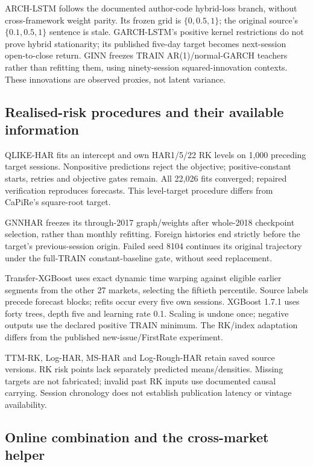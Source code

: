 ARCH-LSTM follows the documented author-code hybrid-loss branch, without cross-framework weight parity. Its frozen grid is $\{0,0.5,1\}$; the original source's $\{0.1,0.5,1\}$ sentence is stale. GARCH-LSTM's positive kernel restrictions do not prove hybrid stationarity; its published five-day target becomes next-session open-to-close return. GINN freezes TRAIN AR(1)/normal-GARCH teachers rather than refitting them, using ninety-session squared-innovation contexts. These innovations are observed proxies, not latent variance.

\subsection{Realised-risk procedures and their available information}

QLIKE-HAR fits an intercept and own HAR1/5/22 RK levels on 1,000 preceding target sessions. Nonpositive predictions reject the objective; positive-constant starts, retries and objective gates remain. All 22,026 fits converged; repaired verification reproduces forecasts. This level-target procedure differs from CaPiRe's square-root target.

GNNHAR freezes its through-2017 graph/weights after whole-2018 checkpoint selection, rather than monthly refitting. Foreign histories end strictly before the target's previous-session origin. Failed seed 8104 continues its original trajectory under the full-TRAIN constant-baseline gate, without seed replacement.

Transfer-XGBoost uses exact dynamic time warping against eligible earlier segments from the other 27 markets, selecting the fiftieth percentile. Source labels precede forecast blocks; refits occur every five own sessions. XGBoost 1.7.1 uses forty trees, depth five and learning rate 0.1. Scaling is undone once; negative outputs use the declared positive TRAIN minimum. The RK/index adaptation differs from the published new-issue/FirstRate experiment.

TTM-RK, Log-HAR, MS-HAR and Log-Rough-HAR retain saved source versions. RK risk points lack separately predicted means/densities. Missing targets are not fabricated; invalid past RK inputs use documented causal carrying. Session chronology does not establish publication latency or vintage availability.

\subsection{Online combination and the cross-market helper}

